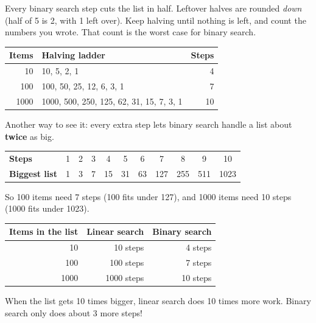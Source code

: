 \begin{tip}
Every binary search step cuts the list in half. Leftover halves are rounded \emph{down} (half of 5 is 2, with 1 left over). Keep halving until nothing is left, and count the numbers you wrote. That count is the worst case for binary search.
\begin{center}
\renewcommand{\arraystretch}{1.25}
\begin{tabular}{@{}rlr@{}}
\toprule
\textbf{Items} & \textbf{Halving ladder} & \textbf{Steps} \\ \midrule
10 & 10, 5, 2, 1 & 4 \\
100 & 100, 50, 25, 12, 6, 3, 1 & 7 \\
1000 & 1000, 500, 250, 125, 62, 31, 15, 7, 3, 1 & 10 \\
\bottomrule
\end{tabular}
\end{center}
Another way to see it: every extra step lets binary search handle a list about \textbf{twice} as big.
\begin{center}
\renewcommand{\arraystretch}{1.2}
\begin{tabular}{@{}lcccccccccc@{}}
\toprule
\textbf{Steps} & 1 & 2 & 3 & 4 & 5 & 6 & 7 & 8 & 9 & 10 \\
\textbf{Biggest list} & 1 & 3 & 7 & 15 & 31 & 63 & 127 & 255 & 511 & 1023 \\
\bottomrule
\end{tabular}
\end{center}
So 100 items need 7 steps (100 fits under 127), and 1000 items need 10 steps (1000 fits under 1023).
\end{tip}

\begin{center}
\begin{tabular}{@{}rrr@{}}
\toprule
\textbf{Items in the list} & \textbf{Linear search} & \textbf{Binary search} \\ \midrule
10 & 10 steps & 4 steps \\
100 & 100 steps & 7 steps \\
1000 & 1000 steps & 10 steps \\
\bottomrule
\end{tabular}
\end{center}
When the list gets 10 times bigger, linear search does 10 times more work. Binary search only does about 3 more steps!

